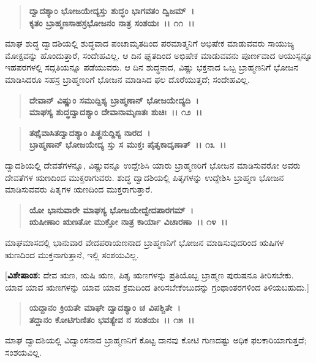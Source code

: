 \begin{verse}
\textbf{ದ್ವಾದಶ್ಯಾಂ ಭೋಜಯೇದ್ಯಸ್ತು ಶುದ್ಧಂ ಭಾಗವತಂ ದ್ವಿಜಮ್~।}\\\textbf{ಕೃತಂ ಬ್ರಾಹ್ಮಣಸಾಹಸ್ರಭೋಜನಂ ನಾತ್ರ ಸಂಶಯಃ~।। ೧೧~।।}
\end{verse}

ಮಾಘ ಶುದ್ಧ ದ್ವಾದಶಿಯಲ್ಲಿ ಶುದ್ಧವಾದ ಪಂಚಾಮೃತದಿಂದ ಪರಮಾತ್ಮನಿಗೆ ಅಭಿಷೇಕ ಮಾಡುವವರು ಸಾಯುಜ್ಯ ಮೋಕ್ಷವನ್ನು ಹೊಂದುತ್ತಾರೆ, ಸಂದೇಹವಿಲ್ಲ. ಆ ದಿನ ಘೃತದಿಂದ ಅಭಿಷೇಕ ಮಾಡುವವನು ಪೂರ್ಣವಾದ ಆಯುಸ್ಸನ್ನೂ ಇಹಪರಗಳಲ್ಲಿ ಸದ್ಗತಿಯನ್ನೂ ಪಡೆಯುವರು. ಆ ದಿನ ಶುದ್ಧನಾದ, ವಿಷ್ಣು ಭಕ್ತನಾದ ಒಬ್ಬ ಬ್ರಾಹ್ಮಣನಿಗೆ ಭೋಜನ ಮಾಡಿಸಿದರೂ ಸಹಸ್ರ ಬ್ರಾಹ್ಮಣರಿಗೆ ಭೋಜನ ಮಾಡಿಸಿದ ಫಲ ದೊರೆಯುತ್ತದೆ; ಸಂದೇಹವಿಲ್ಲ.

\begin{verse}
\textbf{ದೇವಾನ್ ವಿಷ್ಣುಂ ಸಮುದ್ದಿಶ್ಯ ಬ್ರಾಹ್ಮಣಾನ್ ಭೋಜಯೇದ್ಯದಿ~।}\\\textbf{ಮಾಘಸ್ಯ ಶುದ್ಧದ್ವಾದಶ್ಯಾಂ ದೇವಾನಾಮೃಣತಃ ಶುಚಿಃ~।। ೧೨~।।} 
\end{verse}

\begin{verse}
\textbf{ತಥೈವಾಸಿತದ್ವಾದಶ್ಯಾಂ ಪಿತೄನುದ್ದಿಶ್ಯ ನಾರದ~।}\\\textbf{ಬ್ರಾಹ್ಮಣಾನ್ ಭೋಜಯೇದ್ಯ ಸ್ತು ಸ ಮುಕ್ತಃ ಪೈತೃಕಾದೃಣಾತ್~।। ೧೩~।।}
\end{verse}

ದ್ವಾದಶಿಯಲ್ಲಿ ದೇವತೆಗಳನ್ನೂ, ವಿಷ್ಣುವನ್ನೂ ಉದ್ದೇಶಿಸಿ ಯಾರು ಬ್ರಾಹ್ಮಣರಿಗೆ ಭೋಜನ ಮಾಡಿಸುವರೋ ಅವರು ದೇವತೆಗಳ ಋಣದಿಂದ ಮುಕ್ತರಾಗುವರು. ಶುದ್ಧ ದ್ವಾದಶಿಯಲ್ಲಿ ಪಿತೃಗಳನ್ನು ಉದ್ದೇಶಿಸಿ ಬ್ರಾಹ್ಮಣ ಭೋಜನ ಮಾಡಿಸುವವರು ಪಿತೃಗಳ ಋಣದಿಂದ ಮುಕ್ತ\-ರಾಗುತ್ತಾರೆ.

\begin{verse}
\textbf{ಯೋ ಭಾನುವಾರೇ ಮಾಘಸ್ಯ ಭೋಜಯೇದ್ವೇದಪಾರಗಮ್~।}\\\textbf{ಋಷೀಣಾಂ ಋಣತೋ ಮುಕ್ತೋ ನಾತ್ರ ಕಾರ್ಯಾ ವಿಚಾರಣಾ~।। ೧೪~।।}
\end{verse}

ಮಾಘಮಾಸದಲ್ಲಿ ಭಾನುವಾರ ವೇದಪರಾಯಣನಾದ ಬ್ರಾಹ್ಮಣನಿಗೆ ಭೋಜನ ಮಾಡಿಸುವುದರಿಂದ ಋಷಿಗಳ ಋಣದಿಂದ ಮುಕ್ತನಾಗುತ್ತಾನೆ, ಇಲ್ಲಿ ಸಂಶಯವಿಲ್ಲ.

[\textbf{ವಿಶೇಷಾಂಶ:} ದೇವ ಋಣ, ಋಷಿ ಋಣ, ಪಿತೃ ಋಣಗಳನ್ನು ಪ್ರತಿಯೊಬ್ಬ ಬ್ರಾಹ್ಮಣ ಪುರುಷನೂ ತೀರಿಸಬೇಕು. ಯಾವ ಯಾವ ಋಣಗಳನ್ನು ಯಾವ ಯಾವ ಕ್ರಮದಿಂದ ತೀರಿಸಬೇಕೆಂಬುದನ್ನು ಗ್ರಂಥಾಂತರಗಳಿಂದ ತಿಳಿಯಬಹುದು.]

\begin{verse}
\textbf{ಯದ್ದಾನಂ ಕ್ರಿಯತೇ ಮಾಘೇ ದ್ವಾದಶ್ಯಾಂ ಚ ವಿಪಶ್ಚಿತೇ~।}\\\textbf{ತದ್ದಾನಂ ಕೋಟಿಗುಣಿತಂ ಭವತ್ಯೇವ ನ ಸಂಶಯಃ~।। ೧೫~।।}
\end{verse}

ಮಾಘ ದ್ವಾದಶಿಯಲ್ಲಿ ವಿದ್ವಾಂಸನಾದ ಬ್ರಾಹ್ಮಣನಿಗೆ ಕೊಟ್ಟ ದಾನವು ಕೋಟಿ ಗುಣದಷ್ಟು ಅಧಿಕ ಫಲಕಾರಿಯಾಗುತ್ತದೆ; ಸಂಶಯವಿಲ್ಲ.

